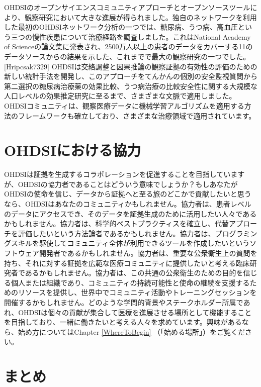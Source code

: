 \documentclass[
  11pt]{book}
\theoremstyle{definition}
\theoremstyle{definition}
\theoremstyle{definition}
\theoremstyle{definition}
\theoremstyle{remark}
\begin{document}
OHDSIのオープンサイエンスコミュニティアプローチとオープンソースツールにより、観察研究において大きな進展が得られました。独自のネットワークを利用した最初のOHDSIネットワーク分析の一つでは、糖尿病、うつ病、高血圧という三つの慢性疾患について治療経路を調査しました。これはNational Academy of Scienceの論文集に発表され、2500万人以上の患者のデータをカバーする11のデータソースからの結果を示した、これまでで最大の観察研究の一つでした。{[}Hripcsak7329{]} OHDSIは交絡調整\citep{tian_2018}と因果推論の観察証拠の有効性の評価のための新しい統計手法を開発し、このアプローチをてんかんの個別の安全監視質問\citep{duke_2017}から第二選択の糖尿病治療薬の効果比較\citep{vashisht_2018}、うつ病治療の比較安全性に関する大規模な人口レベルの効果推定研究\citep{schuemie_2018b}に至るまで、さまざまな文脈で適用しました。OHDSIコミュニティは、観察医療データに機械学習アルゴリズムを適用する方法のフレームワークも確立しており\citep{reps2018}、さまざまな治療領域で適用されています。\citep{johnston_2019, cepeda_2018, reps_2019}

\section{OHDSIにおける協力}\label{ohdsiux306bux304aux3051ux308bux5354ux529b}

OHDSIは証拠を生成するコラボレーションを促進することを目指していますが、OHDSIの協力者であることはどういう意味でしょうか？もしあなたがOHDSIの使命を信じ、データから証拠へと至る旅のどこかで貢献したいと思うなら、OHDSIはあなたのコミュニティかもしれません。協力者は、患者レベルのデータにアクセスでき、そのデータを証拠生成のために活用したい人々であるかもしれません。協力者は、科学的ベストプラクティスを確立し、代替アプローチを評価したいという方法論者であるかもしれません。協力者は、プログラミングスキルを駆使してコミュニティ全体が利用できるツールを作成したいというソフトウェア開発者であるかもしれません。協力者は、重要な公衆衛生上の質問を持ち、それに対する証拠を広範な医療コミュニティに提供したいと考える臨床研究者であるかもしれません。協力者は、この共通の公衆衛生のための目的を信じる個人または組織であり、コミュニティの持続可能性と使命の継続を支援するためのリソースを提供し、世界中でコミュニティ活動やトレーニングセッションを開催するかもしれません。どのような学問的背景やステークホルダー所属であれ、OHDSIは個々の貢献が集合して医療を進展させる場所として機能することを目指しており、一緒に働きたいと考える人々を求めています。興味があるなら、始め方についてはChapter \ref{WhereToBegin} （「始める場所」）をご覧ください。

\section{まとめ}\label{ux307eux3068ux3081}
\end{document}
